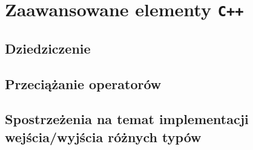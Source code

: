 \chapter{Zaawansowane elementy \texttt{C++}}

\section{Dziedziczenie}

\section{Przeciążanie operatorów}

\section{Spostrzeżenia na temat implementacji wejścia/wyjścia różnych typów}
